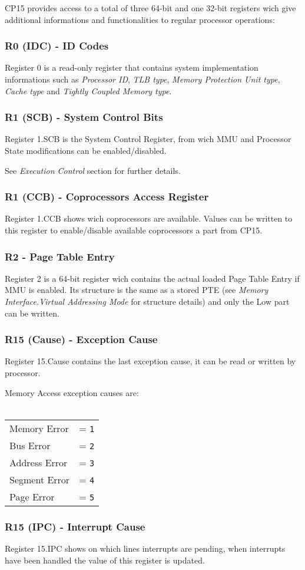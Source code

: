 CP15 provides access to a total of three 64-bit and one 32-bit registers wich give additional informations and functionalities to regular processor operations:

\subsubsection{R0 (IDC) - ID Codes}
Register 0 is a read-only register that contains system implementation informations such as \emph{Processor ID}, \emph{TLB type}, \emph{Memory Protection Unit type}, \emph{Cache type} and \emph{Tightly Coupled Memory type}.

\subsubsection{R1 (SCB) - System Control Bits}
Register 1.SCB is the System Control Register, from wich MMU and Processor State modifications can be enabled/disabled.

See \emph{Execution Control} section for further details.

\subsubsection{R1 (CCB) - Coprocessors Access Register}
Register 1.CCB shows wich coprocessors are available. Values can be written to this register to enable/disable available coprocessors a part from CP15.



\subsubsection{R2 - Page Table Entry}
Register 2 is a 64-bit register wich contains the actual loaded Page Table Entry if MMU is enabled. Its structure is the same as a stored PTE (see \emph{Memory Interface.Virtual Addressing Mode} for structure details) and only the Low part can be written.

\subsubsection{R15 (Cause) - Exception Cause}
Register 15.Cause contains the last exception cause, it can be read or written by processor.

Memory Access exception causes are:
\\
\\
\begin{tabular}{ll}
Memory Error & = \texttt{1}\\
Bus Error & = \texttt{2}\\
Address Error & = \texttt{3}\\
Segment Error & = \texttt{4}\\
Page Error & = \texttt{5}\\
\end{tabular}

\subsubsection{R15 (IPC) - Interrupt Cause}
Register 15.IPC shows on which lines interrupts are pending, when interrupts have been handled the value of this register is updated.
